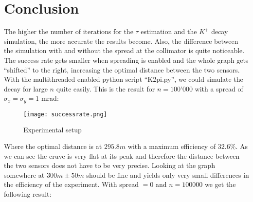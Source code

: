 \documentclass[11pt]{report}
\begin{document}
\section*{Conclusion}


The higher the number of iterations for the $\tau$ estimation and the $K^+$ decay simulation, the more accurate the results become. 
Also, the difference between the simulation with and without the spread at the collimator is quite noticeable. The success rate gets smaller when spreading is enabled and the whole graph gets “shifted” to the right, increasing the optimal distance between the two sensors. 
With the multithreaded enabled python script “K2pi.py”, we could simulate the decay for large $n$ quite easily. This is the result for $n = 100’000$ with a spread of $\sigma_x=\sigma_y=1$ mrad:

\begin{figure}[h] 
\centering
\texttt{[image: successrate.png]} 
\caption{Experimental setup}
\label{fig:Zee}    
\end{figure}

Where the optimal distance is at $295.8m$ with a maximum efficiency of $32.6 \%$. As we can see the cruve is very flat at its peak and therefore the distance between the two sensors does not have to be very precise. Looking at the graph somewhere at $300m \pm 50m$ should be fine and yields only very small differences in the efficiency of the experiment. 
With spread $= 0$ and $n = 100000$ we get the following result:
\end{document}
